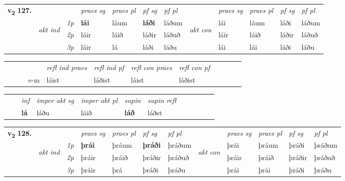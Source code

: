 \begin{tabular}{llllllllllll} \toprule
\multirow{4}{*}{{{\textbf{v{\textsubscript{2}}} \Large{\textbf{127.}}}}}  & &   &  \textit{praes sg}  & \textit{praes pl}  &\textit{ pf sg} & \textit{pf pl} &  &  \textit{praes sg}  & \textit{praes pl}  & \textit{pf sg} & \textit{pf pl } \\*
	\cmidrule{4-7} \cmidrule{9-12}
 & \multirow{3}{*}{\begin{turn}{90}\textit{akt ind}\end{turn}} & {\textit{1p}} & \textbf{lái} & láum    & \textbf{láði} & láðum & \multirow{3}{*}{\begin{turn}{90}\textit{akt con}\end{turn}} &lái & láum & láði & láðum\\*
& &  {\textit{2p}} &  láir  & láið   & láðir & láðuð & & láir & láið & láðir & láðuð \\*
& &  {\textit{3p}} & láir & lá   & láði & láðu & & lái & lái& láði & láðu  \\*
\cmidrule{4-7} \cmidrule{9-12}
\end{tabular}


\begin{tabular}{llllllllllll}
 & &  & &  \textit{refl ind praes} & \textit{refl ind pf} & \textit{refl con praes} & \textit{refl con pf} \\*
&  & & e-m & láist & láðist & láist & láðist \\*
\cmidrule{5-9}
\end{tabular}


\begin{tabular}{llllllllllll}
 & & \textit{inf} & \textit{imper akt sg} & \textit{imper akt pl}    & \textit{supin} & \textit{supin refl}      \\*
  & & \textbf{lá} & láðu  & láið    &  \textbf{láð} & láðst  \\*
\cmidrule{1-12}
\end{tabular}



\begin{tabular}{llllllllllll} \toprule
\multirow{4}{*}{{{\textbf{v{\textsubscript{2}}} \Large{\textbf{128.}}}}}  & &   &  \textit{praes sg}  & \textit{praes pl}  &\textit{ pf sg} & \textit{pf pl} &  &  \textit{praes sg}  & \textit{praes pl}  & \textit{pf sg} & \textit{pf pl } \\*
	\cmidrule{4-7} \cmidrule{9-12}
 & \multirow{3}{*}{\begin{turn}{90}\textit{akt ind}\end{turn}} & {\textit{1p}} & \textbf{þrái} & þráum    & \textbf{þráði} & þráðum & \multirow{3}{*}{\begin{turn}{90}\textit{akt con}\end{turn}} &þrái & þráum & þráði & þráðum\\*
& &  {\textit{2p}} &  þráir  & þráið   & þráðir & þráðuð & & þráir & þráið & þráðir & þráðuð \\*
& &  {\textit{3p}} & þráir & þrá   & þráði & þráðu & & þrái & þrái& þráði & þráðu  \\*
\cmidrule{4-7} \cmidrule{9-12}
\end{tabular}


